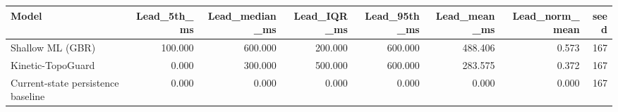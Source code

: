 \begin{tabular}{lrrrrrrr}
\toprule
Model & Lead\_5th\_ms & Lead\_median\_ms & Lead\_IQR\_ms & Lead\_95th\_ms & Lead\_mean\_ms & Lead\_norm\_mean & seed \\
\midrule
Shallow ML (GBR) & 100.000 & 600.000 & 200.000 & 600.000 & 488.406 & 0.573 & 167 \\
Kinetic-TopoGuard & 0.000 & 300.000 & 500.000 & 600.000 & 283.575 & 0.372 & 167 \\
Current-state persistence baseline & 0.000 & 0.000 & 0.000 & 0.000 & 0.000 & 0.000 & 167 \\
\bottomrule
\end{tabular}